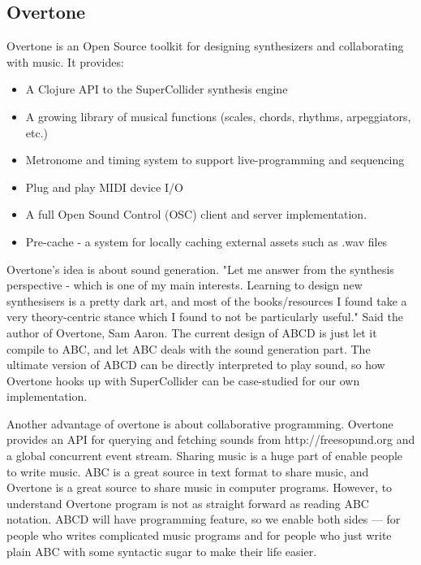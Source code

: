 \subsection{Overtone}

Overtone is an Open Source toolkit for designing synthesizers and collaborating with music. It provides\cite{Aaron16}:
\begin{itemize}
\item A Clojure API to the SuperCollider synthesis engine
\item A growing library of musical functions (scales, chords, rhythms, arpeggiators, etc.)
\item Metronome and timing system to support live-programming and sequencing
\item Plug and play MIDI device I/O
\item A full Open Sound Control (OSC) client and server implementation.
\item Pre-cache - a system for locally caching external assets such as .wav files
\end{itemize}

Overtone's idea is about sound generation. "Let me answer from the synthesis perspective - which is one of my main interests. Learning to design new synthesisers is a pretty dark art, and most of the books/resources I found take a very theory-centric stance which I found to not be particularly useful." Said the author of Overtone, Sam Aaron\cite{Aaron13}. The current design of ABCD is just let it compile to ABC, and let ABC deals with the sound generation part. The ultimate version of ABCD can be directly interpreted to play sound, so how Overtone hooks up with SuperCollider can be case-studied for our own implementation.

Another advantage of overtone is about collaborative programming. Overtone provides an API for querying and fetching sounds from http://freesopund.org and a global concurrent event stream\cite{Aaron16}. Sharing music is a huge part of enable people to write music. ABC is a great source in text format to share music, and Overtone is a great source to share music in computer programs. However, to understand Overtone program is not as straight forward as reading ABC notation. ABCD will have programming feature, so we enable both sides --- for people who writes complicated music programs and for people who just write plain ABC with some syntactic sugar to make their life easier.

